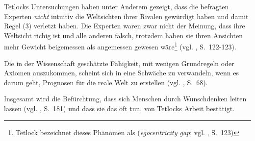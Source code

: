 Tetlocks Untersuchungen haben unter Anderem gezeigt, dass die befragten Experten
\emph{nicht} intuitiv die Weltsichten ihrer Rivalen gewürdigt haben und damit
Regel (3) verletzt haben. Die Experten waren zwar nicht der Meinung, dass ihre
Weltsicht richig ist und alle anderen falsch, trotzdem haben sie ihren Ansichten
mehr Gewicht beigemessen als angemessen gewesen wäre\footnote{
Tetlock bezeichnet dieses Phänomen als \grqq{}
(\emph{egocentricity gap}; vgl. \cite{Tetlock}, S.~123)
} (vgl. \cite{Tetlock}, S.~122-123). 

Die in der Wissenschaft geschätzte Fähigkeit, mit wenigen Grundregeln oder
Axiomen auszukommen, scheint sich in eine Schwäche zu verwandeln, wenn
es darum geht, Prognosen für die reale Welt zu erstellen (vgl. \cite{Tetlock},
S.~68).

Insgesamt wird die Befürchtung, dass sich Menschen durch Wunschdenken leiten
lassen (vgl. \cite{Eisenfuehr}, S.~181) und dass sie das oft tun, von Tetlocks
Arbeit bestätigt.




